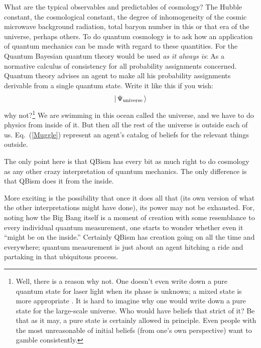 What are the typical observables and predictables of cosmology?  The Hubble constant, the cosmological constant, the degree of inhomogeneity of the cosmic microwave background radiation, total baryon number in this or that era of the universe, perhaps others.  To do quantum cosmology is to ask how an application of quantum mechanics can be made with regard to these quantities.  For the Quantum Bayesian quantum theory would be used {\it as it always is}:  As a normative calculus of consistency for all probability assignments concerned.  Quantum theory advises an agent to make all his probability assignments derivable from a single quantum state.  Write it like this if you wish:
\begin{equation}
|\,\Psi_{\rm \small universe}\,\rangle
\label{Muggle}
\end{equation}
why not?\footnote{Well, there is a reason why not. One doesn't even write down a pure quantum state for laser light when its phase is unknown; a mixed state is more appropriate \cite{vanEnk02}.  It is hard to imagine why one would write down a pure state for the large-scale universe.  Who would have beliefs that strict of it?  Be that as it may, a pure state is certainly allowed in principle.  Even people with the most unreasonable of initial beliefs (from one's own perspective) want to gamble consistently.} We are swimming in this ocean called the universe, and we have to do physics from inside of it.  But then all the rest of the universe is outside each of us.  Eq.~(\ref{Muggle}) represent an agent's catalog of beliefs for the relevant things outside.

The only point here is that QBism has every bit as much right to do cosmology as any other crazy interpretation of quantum mechanics.  The only difference is that QBism does it from the inside.

More exciting is the possibility that once it does all that (its own version of what the other interpretations might have done), its power may not be exhausted.  For, noting how the Big Bang itself is a moment of creation with some resemblance to every individual quantum measurement, one starts to wonder whether even it ``might be on the inside.''  Certainly QBism has creation going on all the time and everywhere; quantum measurement is just about an agent hitching a ride and partaking in that ubiquitous process.


